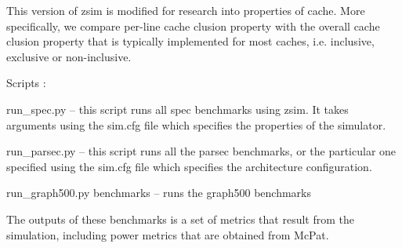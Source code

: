 This version of zsim is modified for research into properties of cache. More specifically, we compare per-\/line cache clusion property with the overall cache clusion property that is typically implemented for most caches, i.\-e. inclusive, exclusive or non-\/inclusive.

Scripts \-:


\begin{DoxyEnumerate}
\item run\-\_\-spec.\-py -- this script runs all spec benchmarks using zsim. It takes arguments using the sim.\-cfg file which specifies the properties of the simulator.
\item run\-\_\-parsec.\-py -- this script runs all the parsec benchmarks, or the particular one specified using the sim.\-cfg file which specifies the architecture configuration.
\item run\-\_\-graph500.\-py benchmarks -- runs the graph500 benchmarks
\end{DoxyEnumerate}

The outputs of these benchmarks is a set of metrics that result from the simulation, including power metrics that are obtained from Mc\-Pat. 